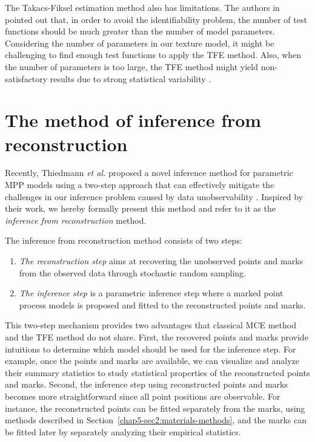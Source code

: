 \documentclass[journal]{IEEEtran}
\begin{document}
The Takacs-Fiksel estimation method also has limitations. The authors
in \cite{dereudre2014estimation} pointed out that, in order to avoid
the identifiability problem, the number of test functions should be
much greater than the number of model parameters. Considering the
number of parameters in our texture model, it might be challenging to
find enough test functions to apply the TFE method. Also, when the
number of parameters is too large, the TFE method might yield
non-satisfactory results due to strong statistical variability
\cite{dereudre2014estimation}.

\section{The method of inference from reconstruction }
\label{sec:meth-infer-from-1}

Recently, Thiedmann \textit{et al.}  proposed a novel inference method
for parametric MPP models using a two-step approach that can
effectively mitigate the challenges in our inference problem caused by
data unobservability \cite{thiedmann2011stochastic}. Inspired by their
work, we hereby formally present this method and refer to it as the
\textit{inference from reconstruction} method.

The inference from reconstruction method consists of two steps:

\begin{enumerate}[leftmargin=*,noitemsep]
\item \textit{The reconstruction step} aims at recovering the
  unobserved points and marks from the observed data through
  stochastic random sampling.
\item \textit{The inference step} is a parametric inference step where
  a marked point process models is proposed and fitted to the
  reconstructed points and marks.
\end{enumerate}

This two-step mechanism provides two advantages that classical MCE
method and the TFE method do not share. First, the recovered points
and marks provide intuitions to determine which model should be used
for the inference step. For example, once the points and marks are
available, we can visualize and analyze their summary statistics to
study statistical properties of the reconstructed points and
marks. Second, the inference step using reconstructed points and marks
becomes more straightforward since all point positions are
observable. For instance, the reconstructed points can be fitted
separately from the marks, using methods described in
Section~\ref{chap5-sec2:materials-methods}, and the marks can be
fitted later by separately analyzing their empirical statistics.
\end{document}
